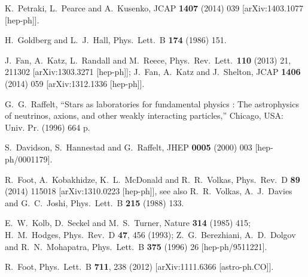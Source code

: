 \documentclass[12pt]{article}
\begin{document}
{{\begin{thebibliography}{999}
  K.~Petraki, L.~Pearce and A.~Kusenko,
  JCAP {\bf 1407} (2014) 039
  [arXiv:1403.1077 [hep-ph]].
  
  H.~Goldberg and L.~J.~Hall,
  Phys.\ Lett.\ B {\bf 174} (1986) 151.
  
  J.~Fan, A.~Katz, L.~Randall and M.~Reece,
  Phys.\ Rev.\ Lett.\  {\bf 110} (2013) 21,  211302
  [arXiv:1303.3271 [hep-ph]];
  J.~Fan, A.~Katz and J.~Shelton,
  JCAP {\bf 1406} (2014) 059
  [arXiv:1312.1336 [hep-ph]].

  G.~G.~Raffelt,
  ``Stars as laboratories for fundamental physics : The astrophysics of neutrinos, axions, and other weakly interacting particles,''
  Chicago, USA: Univ. Pr. (1996) 664 p.

  S.~Davidson, S.~Hannestad and G.~Raffelt,
  JHEP {\bf 0005} (2000) 003
  [hep-ph/0001179].
  
  R.~Foot, A.~Kobakhidze, K.~L.~McDonald and R.~R.~Volkas,
  Phys.\ Rev.\ D {\bf 89} (2014) 115018
  [arXiv:1310.0223 [hep-ph]],
  see also
  R.~R.~Volkas, A.~J.~Davies and G.~C.~Joshi,
  Phys.\ Lett.\ B {\bf 215} (1988) 133.
  
  E.~W.~Kolb, D.~Seckel and M.~S.~Turner,
  Nature {\bf 314} (1985) 415;
H.~M.~Hodges,
Phys.\ Rev.\ D {\bf 47}, 456 (1993);
 Z.~G.~Berezhiani, A.~D.~Dolgov and R.~N.~Mohapatra,
  Phys.\ Lett.\ B {\bf 375} (1996) 26
  [hep-ph/9511221].
  
  R.~Foot,
  Phys.\ Lett.\ B {\bf 711}, 238 (2012)
  [arXiv:1111.6366 [astro-ph.CO]].
  

\end{thebibliography}}}
\end{document}
